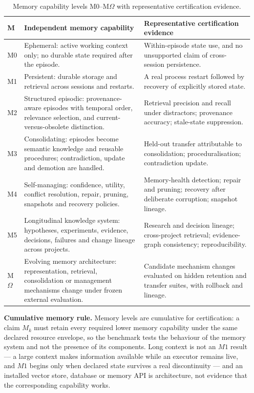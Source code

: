 \documentclass[11pt]{article}
\theoremstyle{definition}
\newcommand{\Om}{\ensuremath{\Omega}}
\begin{document}
\begin{table}[!htbp]
\centering\small
\begin{tabularx}{\textwidth}{@{}lYZ@{}}
\toprule
M & Independent memory capability & Representative certification evidence \\
\midrule
M0 & Ephemeral: active working context only; no durable state required after the episode. & Within-episode state use, and no unsupported claim of cross-session persistence. \\
M1 & Persistent: durable storage and retrieval across sessions and restarts. & A real process restart followed by recovery of explicitly stored state. \\
M2 & Structured episodic: provenance-aware episodes with temporal order, relevance selection, and current-versus-obsolete distinction. & Retrieval precision and recall under distractors; provenance accuracy; stale-state suppression. \\
M3 & Consolidating: episodes become semantic knowledge and reusable procedures; contradiction, update and demotion are handled. & Held-out transfer attributable to consolidation; proceduralisation; contradiction update. \\
M4 & Self-managing: confidence, utility, conflict resolution, repair, pruning, snapshots and recovery policies. & Memory-health detection; repair and pruning; recovery after deliberate corruption; snapshot lineage. \\
M5 & Longitudinal knowledge system: hypotheses, experiments, evidence, decisions, failures and change lineage across projects. & Research and decision lineage; cross-project retrieval; evidence-graph consistency; reproducibility. \\
M\Om{} & Evolving memory architecture: representation, retrieval, consolidation or management mechanisms change under frozen external evaluation. & Candidate mechanism changes evaluated on hidden retention and transfer suites, with rollback and lineage. \\
\bottomrule
\end{tabularx}
\caption{Memory capability levels M0--M\Om{} with representative certification evidence.}
\label{tab:m}
\end{table}

\textbf{Cumulative memory rule.} Memory levels are cumulative for certification: a claim $M_k$ must retain every required lower memory capability under the same declared resource envelope, so the benchmark tests the behaviour of the memory system and not the presence of its components. Long context is not an $M1$ result --- a large context makes information available while an executor remains live, and $M1$ begins only when declared state survives a real discontinuity --- and an installed vector store, database or memory API is architecture, not evidence that the corresponding capability works.
\end{document}
